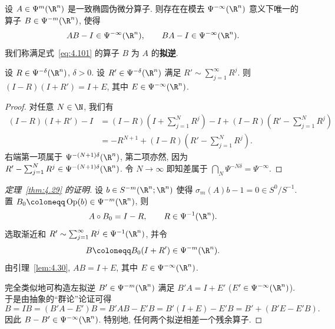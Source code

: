 \begin{theorem}[椭圆拟逆定理]\label{thm:4.29}
设 $A \in \Psi^m(\R^n)$ 是一致椭圆伪微分算子. 则存在在模去 $\Psi^{-\infty}(\R^n)$ 意义下唯一的算子 $B \in \Psi^{-m}(\R^n)$, 使得
\begin{equation}\label{eq:4.101}
    A B - I \in \Psi^{-\infty}(\R^n), \qquad B A - I \in \Psi^{-\infty}(\R^n).
\end{equation}
我们称满足式~\eqref{eq:4.101} 的算子 $B$ 为 $A$ 的\textbf{拟逆}.
\end{theorem}

\begin{lemma}[渐近 Neumann 级数]\label{lem:4.30}
设 $R \in \Psi^{-\delta}(\R^n)$, $\delta > 0$. 设 $R' \in \Psi^{-\delta}(\R^n)$ 满足 $R' \sim \sum_{j=1}^\infty R^j$. 则 $(I - R)(I + R') = I + E$, 其中 $E \in \Psi^{-\infty}(\R^n)$.
\end{lemma}

\begin{proof}
对任意 $N \in \N$, 我们有
\begin{equation}\label{eq:4.102}
    \begin{aligned}
        (I - R)(I + R') - I
        &= (I - R)\left( I + \sum_{j=1}^N R^j \right) - I + (I - R)\left( R' - \sum_{j=1}^N R^j \right) \\
        &= -R^{N+1} + (I - R)\left( R' - \sum_{j=1}^N R^j \right).
    \end{aligned}
\end{equation}
右端第一项属于 $\Psi^{-(N+1)\delta}(\R^n)$, 第二项亦然, 因为 $R' - \sum_{j=1}^N R^j \in \Psi^{-(N+1)\delta}(\R^n)$.
令 $N \to \infty$ 即知差属于 $\bigcap_N \Psi^{-N\delta} = \Psi^{-\infty}$.
\end{proof}

\begin{proof}[定理~\ref{thm:4.29} 的证明]
设 $b \in S^{-m}(\R^n; \R^n)$ 使得 $\sigma_m(A) b - 1 = 0 \in S^0 / S^{-1}$. 置 $B_0 \defeq \Op(b) \in \Psi^{-m}(\R^n)$, 则
\begin{equation}\label{eq:4.103}
    A \circ B_0 = I - R, \qquad R \in \Psi^{-1}(\R^n).
\end{equation}
选取渐近和 $R' \sim \sum_{j=1}^\infty R^j \in \Psi^{-1}(\R^n)$, 并令
\begin{equation}\label{eq:4.104}
    B \defeq B_0 (I + R') \in \Psi^{-m}(\R^n).
\end{equation}
由引理~\ref{lem:4.30}, $A B = I + E$, 其中 $E \in \Psi^{-\infty}(\R^n)$.

完全类似地可构造左拟逆 $B' \in \Psi^{-m}(\R^n)$ 满足 $B' A = I + E'$ ($E' \in \Psi^{-\infty}(\R^n)$). 于是由抽象的``群论''论证可得
\begin{equation}\label{eq:4.105}
    B = I B = (B' A - E') B = B' A B - E' B = B'(I + E) - E' B = B' + (B' E - E' B).
\end{equation}
因此 $B - B' \in \Psi^{-\infty}(\R^n)$. 特别地, 任何两个拟逆相差一个残余算子.
\end{proof}

